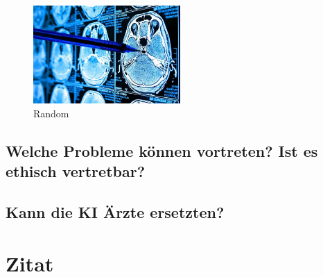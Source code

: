 \documentclass{article}
\begin{document}
\begin{figure}[H]
    \centering
    \includegraphics[width=0.5\textwidth]{kimedizin.jpg}
    \caption{Random}
    \label{fig:kimedizin}
\end{figure}



\subsection {Welche Probleme können vortreten? Ist es ethisch vertretbar?}


\subsection{Kann die KI Ärzte ersetzten?}

\section {Zitat}








\printbibliography
\end{document}
